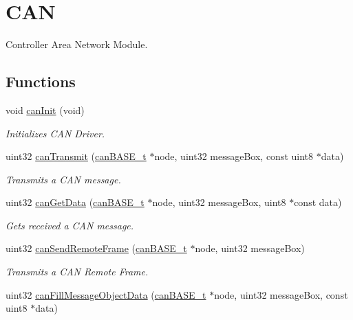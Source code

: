 \hypertarget{group__CAN}{}\section{C\+AN}
\label{group__CAN}


Controller Area Network Module.  


\subsection*{Functions}
\begin{DoxyCompactItemize}
\item 
void \mbox{\hyperlink{group__CAN_ga2d3efc34f7704ab23c293aac2be47764}{can\+Init}} (void)
\begin{DoxyCompactList}\small\item\em Initializes C\+AN Driver. \end{DoxyCompactList}\item 
uint32 \mbox{\hyperlink{group__CAN_ga25acaa78fa2c30c393816a3f3e4b5f7c}{can\+Transmit}} (\mbox{\hyperlink{reg__can_8h_a54ace0879c28a425474845a63d662c05}{can\+B\+A\+S\+E\+\_\+t}} $\ast$node, uint32 message\+Box, const uint8 $\ast$data)
\begin{DoxyCompactList}\small\item\em Transmits a C\+AN message. \end{DoxyCompactList}\item 
uint32 \mbox{\hyperlink{group__CAN_ga1d9e0b086772f54b215f65962c704b82}{can\+Get\+Data}} (\mbox{\hyperlink{reg__can_8h_a54ace0879c28a425474845a63d662c05}{can\+B\+A\+S\+E\+\_\+t}} $\ast$node, uint32 message\+Box, uint8 $\ast$const data)
\begin{DoxyCompactList}\small\item\em Gets received a C\+AN message. \end{DoxyCompactList}\item 
uint32 \mbox{\hyperlink{group__CAN_ga15999e728cf76894d085e91d9e741099}{can\+Send\+Remote\+Frame}} (\mbox{\hyperlink{reg__can_8h_a54ace0879c28a425474845a63d662c05}{can\+B\+A\+S\+E\+\_\+t}} $\ast$node, uint32 message\+Box)
\begin{DoxyCompactList}\small\item\em Transmits a C\+AN Remote Frame. \end{DoxyCompactList}\item 
uint32 \mbox{\hyperlink{group__CAN_ga3d43bba504e28804aa96e0e2e00d68fa}{can\+Fill\+Message\+Object\+Data}} (\mbox{\hyperlink{reg__can_8h_a54ace0879c28a425474845a63d662c05}{can\+B\+A\+S\+E\+\_\+t}} $\ast$node, uint32 message\+Box, const uint8 $\ast$data)

\end{DoxyCompactItemize}
